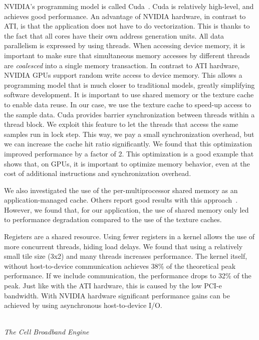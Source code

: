 \documentclass{article}
\begin{document}
\noindent NVIDIA's programming model is called Cuda~\cite{cuda-manual}.
Cuda is relatively high-level, and achieves good performance.
An advantage of NVIDIA hardware, in contrast to ATI, is that the application does not have to do 
vectorization. This is thanks to the fact that all cores have their own address generation units. 
All data parallelism is expressed by using threads.
When accessing device memory, it is important to make sure that
simultaneous memory accesses by different threads are \emph{coalesced}
into a single memory transaction.  In contrast to ATI hardware, NVIDIA
GPUs support random write access to device memory. This allows a
programming model that is much closer to traditional models, greatly
simplifying software development.
It is important to use shared memory or the texture cache to enable data reuse.
In our case, we use the texture cache to speed-up access to the sample data. 
Cuda provides barrier synchronization between threads within a thread block.
We exploit this feature to let
the threads that access the same samples run in lock step.  This way,
we pay a small synchronization overhead, but we can increase the cache hit
ratio significantly.  We found that this optimization improved performance by a factor of 2.
This optimization is a good example that shows that, on GPUs, it is important to optimize
memory behavior, even at the cost of additional instructions and synchronization overhead.

We also investigated the use of the per-multiprocessor shared memory as an
application-managed cache.  Others report good results with this
approach~\cite{gpu-cache}.  However, we found that, for our
application, the use of shared memory only led to performance
degradation compared to the use of the texture caches.

Registers are a shared resource. Using fewer registers in a kernel
allows the use of more concurrent threads, hiding load delays.
We found that using a relatively small tile size (3x2) and many threads increases performance.
The kernel itself, without host-to-device communication achieves 38\%
of the theoretical peak performance.  If we include communication, the
performance drops to 32\% of the peak. Just like with the ATI
hardware, this is caused by the low PCI-e bandwidth.  With NVIDIA
hardware significant performance gains can be achieved by using asynchronous host-to-device I/O.


\noindent \\ \emph{The Cell Broadband Engine}
\end{document}
